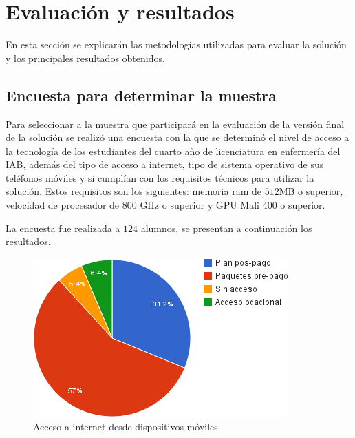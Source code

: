 \section{Evaluación y resultados}

En esta sección se explicarán las metodologías utilizadas para 
evaluar la solución y los principales resultados obtenidos.

\subsection{Encuesta para determinar la muestra}
\label{encuesta_muestra}
Para seleccionar a la muestra que participará en la evaluación de 
la versión final de la solución se realizó una encuesta con la que 
se determinó el nivel de acceso a la tecnología de los estudiantes 
del cuarto año de licenciatura en enfermería del IAB, además del 
tipo de acceso a internet, tipo de sistema operativo de sus teléfonos móviles 
y si cumplían con los requisitos técnicos para utilizar la solución. Estos 
requisitos son los siguientes:  memoria ram de $512$MB o superior, velocidad 
de procesador de $800$ GHz o superior y GPU Mali 400 o superior. 

La encuesta fue realizada a $124$ alumnos, se presentan a continuación los resultados.

\begin{figure}[H]
\centering
\includegraphics[scale=0.5]{../resultados/imagenes/ubicacion_acceso_internet.png}
\caption{Acceso a internet desde dispositivos móviles}
\label{fig:ubicacion_acceso_internet}
\end{figure}

